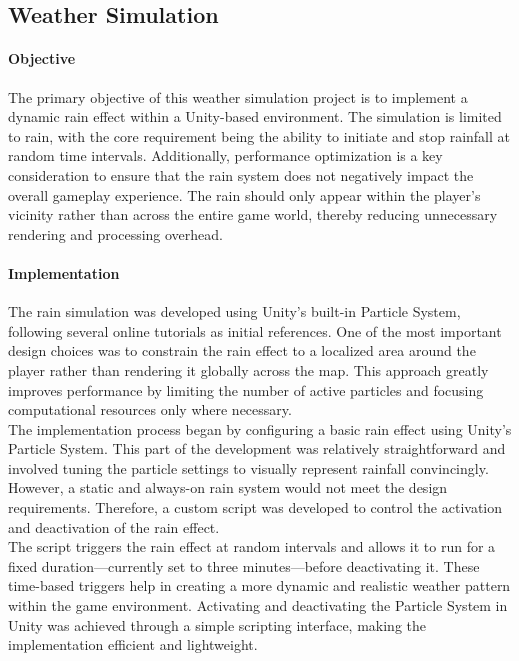 \documentclass{article}
\begin{document}
\newpage
\subsection{Weather Simulation}
\paragraph{Objective}\hfill

The primary objective of this weather simulation project is to implement a dynamic rain effect within a Unity-based environment. The simulation is limited to rain, with the core requirement being the ability to initiate and stop rainfall at random time intervals. Additionally, performance optimization is a key consideration to ensure that the rain system does not negatively impact the overall gameplay experience. The rain should only appear within the player's vicinity rather than across the entire game world, thereby reducing unnecessary rendering and processing overhead.

\paragraph{Implementation}\hfill

The rain simulation was developed using Unity's built-in Particle System, following several online tutorials as initial references. One of the most important design choices was to constrain the rain effect to a localized area around the player rather than rendering it globally across the map. This approach greatly improves performance by limiting the number of active particles and focusing computational resources only where necessary.\\

The implementation process began by configuring a basic rain effect using Unity's Particle System. This part of the development was relatively straightforward and involved tuning the particle settings to visually represent rainfall convincingly. However, a static and always-on rain system would not meet the design requirements. Therefore, a custom script was developed to control the activation and deactivation of the rain effect.\\

The script triggers the rain effect at random intervals and allows it to run for a fixed duration—currently set to three minutes—before deactivating it. These time-based triggers help in creating a more dynamic and realistic weather pattern within the game environment. Activating and deactivating the Particle System in Unity was achieved through a simple scripting interface, making the implementation efficient and lightweight.\\
\end{document}
